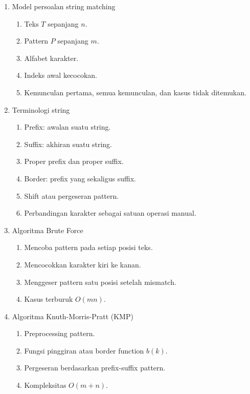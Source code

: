 \begin{enumerate}
    \item Model persoalan string matching
    \begin{enumerate}
        \item Teks $T$ sepanjang $n$.
        \item Pattern $P$ sepanjang $m$.
        \item Alfabet karakter.
        \item Indeks awal kecocokan.
        \item Kemunculan pertama, semua kemunculan, dan kasus tidak ditemukan.
    \end{enumerate}

    \item Terminologi string
    \begin{enumerate}
        \item Prefix: awalan suatu string.
        \item Suffix: akhiran suatu string.
        \item Proper prefix dan proper suffix.
        \item Border: prefix yang sekaligus suffix.
        \item Shift atau pergeseran pattern.
        \item Perbandingan karakter sebagai satuan operasi manual.
    \end{enumerate}

    \item Algoritma Brute Force
    \begin{enumerate}
        \item Mencoba pattern pada setiap posisi teks.
        \item Mencocokkan karakter kiri ke kanan.
        \item Menggeser pattern satu posisi setelah mismatch.
        \item Kasus terburuk $O(mn)$.
    \end{enumerate}

    \item Algoritma Knuth-Morris-Pratt (KMP)
    \begin{enumerate}
        \item Preprocessing pattern.
        \item Fungsi pinggiran atau border function $b(k)$.
        \item Pergeseran berdasarkan prefix-suffix pattern.
        \item Kompleksitas $O(m+n)$.
    \end{enumerate}


\end{enumerate}
